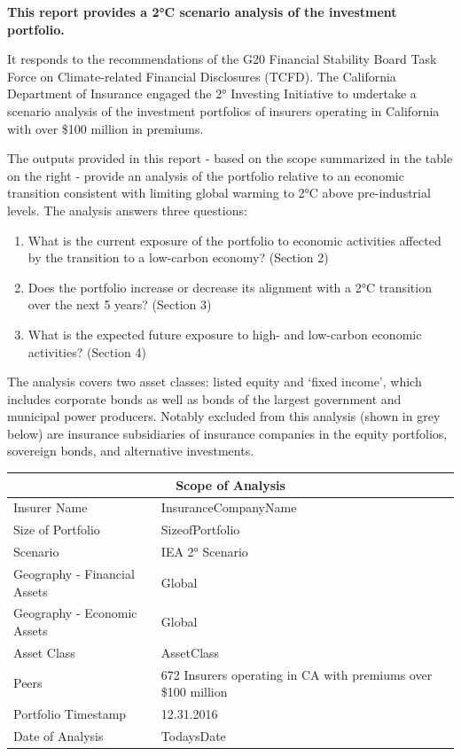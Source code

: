 \documentclass[10pt,table,a4]{article}\usepackage[]{graphicx}\usepackage[]{color}
\begin{document}
	\begin{multicols}{2}
		\textbf{This report provides a 2°C scenario analysis of the investment portfolio.} 
		
		It responds to the recommendations of the G20 Financial Stability Board Task Force on Climate-related Financial Disclosures (TCFD). The California Department of Insurance engaged the 2° Investing Initiative to undertake a scenario analysis of the investment portfolios of insurers operating in California with over \$100 million in premiums.
		
		The outputs provided in this report - based on the scope summarized in the table on the right - provide an analysis of the portfolio relative to an economic transition consistent with limiting global warming to 	2°C above pre-industrial levels. The analysis answers three questions: 
		
		\begin{enumerate}
			\item{What is the current exposure of the portfolio to economic activities affected by the transition to a low-carbon economy? (Section 2)}
			\item{Does the portfolio increase or decrease its alignment with a 2°C transition over the next 5 years? (Section 3)}
			\item{What is the expected future exposure to high- and low-carbon economic activities? (Section 4)}
		\end{enumerate}
		
		The analysis covers two asset classes: listed equity and `fixed income', which includes corporate bonds as well as bonds of the largest government and municipal power producers. Notably excluded from this analysis (shown in grey below) are insurance subsidiaries of insurance companies in the equity portfolios, sovereign bonds, and alternative investments. 

		
		\begin{center}
			{
				\setlength{\tabcolsep}{10pt} %
				\renewcommand{\arraystretch}{1.5} %
				\begin{tabular}{ p{.35\linewidth} p{.49\linewidth} }
					\hline
					\multicolumn{2}{c}{\textbf{Scope of Analysis}} \\
					\hline
					Insurer Name & InsuranceCompanyName \\ 
					Size of Portfolio & SizeofPortfolio \\ 
					Scenario & IEA 2° Scenario \\ 
					Geography - \newline Financial Assets & Global \\ 
					Geography - \newline Economic Assets & Global \\ 
					Asset Class & AssetClass \\ 
					Peers & 672 Insurers operating in CA with premiums over \$100 million \\
					Portfolio Timestamp & 12.31.2016 \\ 
					Date of Analysis & TodaysDate \\ 
					\hline
				\end{tabular}
			}
			

\end{center}
\end{multicols}
\end{document}
